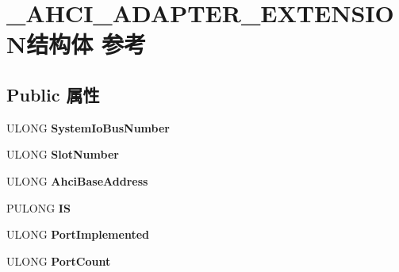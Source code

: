 \hypertarget{struct___a_h_c_i___a_d_a_p_t_e_r___e_x_t_e_n_s_i_o_n}{}\section{\+\_\+\+A\+H\+C\+I\+\_\+\+A\+D\+A\+P\+T\+E\+R\+\_\+\+E\+X\+T\+E\+N\+S\+I\+O\+N结构体 参考}
\label{struct___a_h_c_i___a_d_a_p_t_e_r___e_x_t_e_n_s_i_o_n}
\subsection*{Public 属性}
\begin{DoxyCompactItemize}
\item 
\mbox{\label{struct___a_h_c_i___a_d_a_p_t_e_r___e_x_t_e_n_s_i_o_n_aaebc4c1cbab1ec476730bf09510c05a0}} 
U\+L\+O\+NG {\bfseries System\+Io\+Bus\+Number}
\item 
\mbox{\label{struct___a_h_c_i___a_d_a_p_t_e_r___e_x_t_e_n_s_i_o_n_a77d947f218dfa1bba197535ffc6fba76}} 
U\+L\+O\+NG {\bfseries Slot\+Number}
\item 
\mbox{\label{struct___a_h_c_i___a_d_a_p_t_e_r___e_x_t_e_n_s_i_o_n_abf14c4b48421e833ab74c14b2750d873}} 
U\+L\+O\+NG {\bfseries Ahci\+Base\+Address}
\item 
\mbox{\label{struct___a_h_c_i___a_d_a_p_t_e_r___e_x_t_e_n_s_i_o_n_afc27362eb61d9f288d8bbf8a1ae25827}} 
P\+U\+L\+O\+NG {\bfseries IS}
\item 
\mbox{\label{struct___a_h_c_i___a_d_a_p_t_e_r___e_x_t_e_n_s_i_o_n_a48d838137326a90fb12e4286ec9fa0f3}} 
U\+L\+O\+NG {\bfseries Port\+Implemented}
\item 
\mbox{\label{struct___a_h_c_i___a_d_a_p_t_e_r___e_x_t_e_n_s_i_o_n_a2100380aafeba8f713f5fe0e09f84f6e}} 
U\+L\+O\+NG {\bfseries Port\+Count}
\item 
\mbox{\label{struct___a_h_c_i___a_d_a_p_t_e_r___e_x_t_e_n_s_i_o_n_a8161ea307c29c293e021fc08824f5a78}} 

\end{DoxyCompactItemize}
